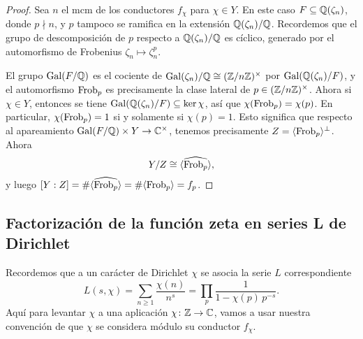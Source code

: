 \begin{teorema}
\begin{proof}
    Sea $n$ el mcm de los conductores $f_\chi$ para $\chi \in Y$. En este caso
    $F \subseteq \mathbb{Q} (\zeta_n)$, donde $p \nmid n$, y $p$ tampoco se
    ramifica en la extensión $\mathbb{Q} (\zeta_n)/\mathbb{Q}$. Recordemos que el grupo de
    descomposición de $p$ respecto a $\mathbb{Q} (\zeta_n)/\mathbb{Q}$ es cíclico, generado
    por el automorfismo de Frobenius $\zeta_n \mapsto \zeta_n^p$.

    El grupo $\operatorname{Gal} (F/\mathbb{Q})$ es el cociente de
    $\operatorname{Gal} (\zeta_n)/\mathbb{Q} \cong (\mathbb{Z}/n\mathbb{Z})^\times$ por
    $\operatorname{Gal} (\mathbb{Q} (\zeta_n)/F)$, y el automorfismo $\operatorname{Frob}_p$ es precisamente
    la clase lateral de $p \in (\mathbb{Z}/n\mathbb{Z})^\times$. Ahora si $\chi \in Y$,
    entonces se tiene $\operatorname{Gal} (\mathbb{Q} (\zeta_n)/F) \subseteq \ker \chi$, así que
    $\chi (\operatorname{Frob}_p) = \chi (p)$. En particular, $\chi (\operatorname{Frob}_p) = 1$ si y
    solamente si $\chi (p) = 1$. Esto significa que respecto al apareamiento
    $\operatorname{Gal} (F/\mathbb{Q}) \times Y \to \mathbb{C}^\times$, tenemos precisamente
    $Z = \langle \operatorname{Frob}_p\rangle^\perp$. Ahora
    $$Y/Z \cong \widehat{\langle\operatorname{Frob}_p\rangle},$$
    y luego
    $[Y:Z] = \#\widehat{\langle\operatorname{Frob}_p\rangle} = \#\langle\operatorname{Frob}_p\rangle = f_p$.
  \end{proof}
\end{teorema}

\subsection{Factorización de la función zeta en series L de Dirichlet}

Recordemos que a un carácter de Dirichlet $\chi$ se asocia la serie $L$
correspondiente
\[ L (s,\chi) = \sum_{n\ge 1} \frac{\chi(n)}{n^s} =
   \prod_p \frac{1}{1 - \chi(p)\,p^{-s}}. \]
Aquí para levantar $\chi$ a una aplicación $\chi\colon \mathbb{Z}\to \mathbb{C}$, vamos a
usar nuestra convención de que $\chi$ se considera módulo su conductor $f_\chi$.

